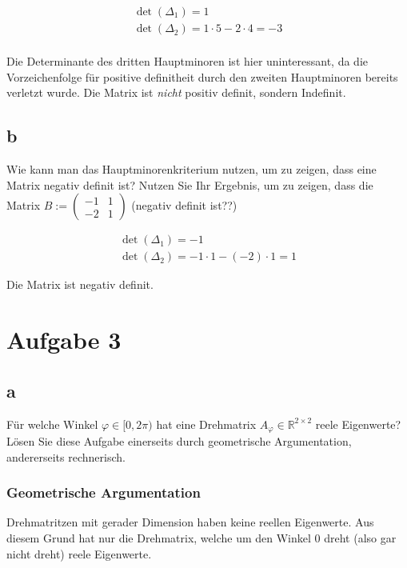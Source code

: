 \begin{align*}
    \det(\Delta_1) = 1 \\
    \det(\Delta_2) = 1 \cdot 5 - 2 \cdot 4 = -3 \\
\end{align*}

Die Determinante des dritten Hauptminoren ist hier uninteressant, da die Vorzeichenfolge für positive definitheit durch den zweiten Hauptminoren bereits verletzt wurde. Die Matrix ist \textit{nicht} positiv definit, sondern Indefinit.

\subsection{b}
Wie kann man das Hauptminorenkriterium nutzen, um zu zeigen, dass eine Matrix negativ definit ist? Nutzen Sie Ihr Ergebnis, um zu zeigen, dass die Matrix $B := \begin{pmatrix}
    -1 & 1 \\
    -2 & 1
\end{pmatrix}$ (negativ definit ist??)

\begin{align*}
    \det(\Delta_1) = -1 \\
    \det(\Delta_2) = -1 \cdot 1 - (-2) \cdot 1 = 1
\end{align*}

Die Matrix ist negativ definit.

\section{Aufgabe 3}

\subsection{a}

Für welche Winkel $\varphi \in [0, 2\pi)$ hat eine Drehmatrix $A_\varphi \in \mathbb{R}^{2 \times 2}$ reele Eigenwerte? Lösen Sie diese Aufgabe einerseits durch geometrische Argumentation, andererseits rechnerisch.

\subsubsection*{Geometrische Argumentation}

Drehmatritzen mit gerader Dimension haben keine reellen Eigenwerte. Aus diesem Grund hat nur die Drehmatrix, welche um den Winkel 0 dreht (also gar nicht dreht) reele Eigenwerte.

